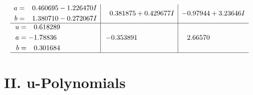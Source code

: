 \documentclass[1p]{elsarticle_modified}
\theoremstyle{definition}
\begin{document}
$$\begin{array}{c|c|c}
\begin{aligned}
a &= \phantom{-}0.460695 - 1.226470 I \\
b &= \phantom{-}1.380710 - 0.272067 I\end{aligned}
 & \phantom{-}0.381875 + 0.429677 I & -0.97944 + 3.23646 I \\ \hline\begin{aligned}
u &= \phantom{-}0.618289\phantom{ +0.000000I} \\
a &= -1.78836\phantom{ +0.000000I} \\
b &= \phantom{-}0.301684\phantom{ +0.000000I}\end{aligned}
 & -0.353891\phantom{ +0.000000I} & \phantom{-}2.66570\phantom{ +0.000000I}\\
 \hline 
 \end{array}$$\newpage
\newpage\renewcommand{\arraystretch}{1}
\centering \section*{ II. u-Polynomials}
\end{document}
